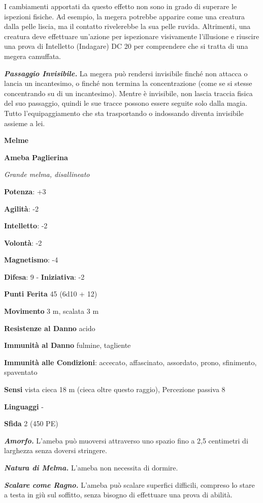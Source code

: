 \begin{multicols}{2}
I cambiamenti apportati da questo effetto non sono in grado di superare
le ispezioni fisiche. Ad esempio, la megera potrebbe apparire come una
creatura dalla pelle liscia, ma il contatto rivelerebbe la sua pelle
ruvida. Altrimenti, una creatura deve effettuare un'azione per
ispezionare visivamente l'illusione e riuscire una prova di Intelletto
(Indagare) DC 20 per comprendere che si tratta di una megera camuffata.

\emph{\textbf{Passaggio Invisibile.}} La megera può rendersi invisibile
finché non attacca o lancia un incantesimo, o finché non termina la
concentrazione (come se si stesse concentrando su di un incantesimo).
Mentre è invisibile, non lascia traccia fisica del suo passaggio, quindi
le sue tracce possono essere seguite solo dalla magia. Tutto
l'equipaggiamento che sta trasportando o indossando diventa invisibile
assieme a lei.

\textbf{Melme}

\textbf{Ameba Paglierina}

\emph{Grande melma, disallineato}

\textbf{Potenza}: +3

\textbf{Agilità}: -2

\textbf{Intelletto}: -2

\textbf{Volontà}: -2

\textbf{Magnetismo}: -4

\textbf{Difesa}: 9 - \textbf{Iniziativa}: -2

\textbf{Punti Ferita} 45 (6d10 + 12)

\textbf{Movimento} 3 m, scalata 3 m

\textbf{Resistenze al Danno} acido

\textbf{Immunità al Danno} fulmine, tagliente

\textbf{Immunità alle Condizioni}: accecato, affascinato, assordato,
prono, sfinimento, spaventato

\textbf{Sensi} vista cieca 18 m (cieca oltre questo raggio), Percezione
passiva 8

\textbf{Linguaggi} -

\textbf{Sfida} 2 (450 PE)\smallskip

\emph{\textbf{Amorfo.}} L'ameba può muoversi attraverso uno spazio fino
a 2,5 centimetri di larghezza senza doversi stringere.

\emph{\textbf{Natura di Melma.}} L'ameba non necessita di dormire.

\emph{\textbf{Scalare come Ragno.}} L'ameba può scalare superfici
difficili, compreso lo stare a testa in giù sul soffitto, senza bisogno
di effettuare una prova di abilità.


\end{multicols}
